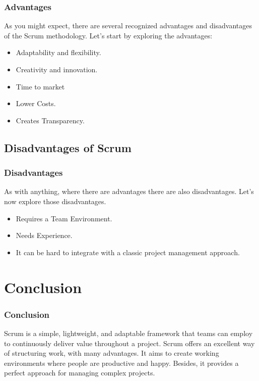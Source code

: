 \documentclass[
	11pt, %
]{beamer}
\begin{document}
\begin{frame}
	\frametitle{Advantages}
	As you might expect, there are several recognized advantages and disadvantages of the Scrum methodology.
	Let's start by exploring the advantages:
	\newline

	\begin{itemize}
		\item Adaptability and flexibility.
		\item Creativity and innovation.
		\item Time to market
		\item Lower Costs.
		\item Creates Transparency.
	\end{itemize}

\end{frame}

\subsection{Disadvantages of Scrum}
\begin{frame}
	\frametitle{Disadvantages}
	As with anything, where there are advantages there are also disadvantages.
	Let's now explore those disadvantages.
	\newline

	\begin{itemize}
		\item Requires a Team Environment.
		\item Needs Experience.
		\item It can be hard to integrate with a classic project management approach.
	\end{itemize}
\end{frame}


\section{Conclusion}

\begin{frame}
	\frametitle{Conclusion}
	Scrum is a simple, lightweight, and adaptable framework that
	teams can employ to continuously deliver value throughout a project.
	Scrum offers an excellent way of structuring work, with many advantages.
	It aims to create working environments where people are productive and happy.
	Besides, it provides a perfect approach for managing complex projects.
\end{frame}
\end{document}
